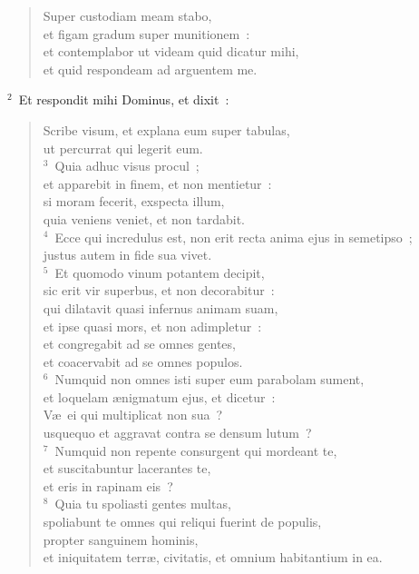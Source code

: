 \begin{flushleft}\begin{verse}\vspace{-19pt}Super custodiam meam stabo,\\ et figam gradum super munitionem~:\\ et contemplabor ut videam quid dicatur mihi,\\ et quid respondeam ad arguentem me.\end{verse}\end{flushleft}


${}^{2}$~Et respondit mihi Dominus, et dixit~: \begin{flushleft}\begin{verse}Scribe visum, et explana eum super tabulas,\\ ut percurrat qui legerit eum.\\
${}^{3}$~Quia adhuc visus procul~;\\ et apparebit in finem, et non mentietur~:\\ si moram fecerit, exspecta illum,\\ quia veniens veniet, et non tardabit.\\
${}^{4}$~Ecce qui incredulus est, non erit recta anima ejus in semetipso~;\\ justus autem in fide sua vivet.\\
${}^{5}$~Et quomodo vinum potantem decipit,\\ sic erit vir superbus, et non decorabitur~:\\ qui dilatavit quasi infernus animam suam,\\ et ipse quasi mors, et non adimpletur~:\\ et congregabit ad se omnes gentes,\\ et coacervabit ad se omnes populos.\\
${}^{6}$~Numquid non omnes isti super eum parabolam sument,\\ et loquelam \ae nigmatum ejus, et dicetur~:\\ V\ae\ ei qui multiplicat non sua~?\\ usquequo et aggravat contra se densum lutum~?\\
${}^{7}$~Numquid non repente consurgent qui mordeant te,\\ et suscitabuntur lacerantes te,\\ et eris in rapinam eis~?\\
${}^{8}$~Quia tu spoliasti gentes multas,\\ spoliabunt te omnes qui reliqui fuerint de populis,\\ propter sanguinem hominis,\\ et iniquitatem terr\ae , civitatis, et omnium habitantium in ea.\\

\end{verse}
\end{flushleft}
